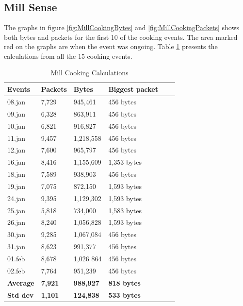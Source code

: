 \subsection{Mill Sense}
The graphs in figure \ref{fig:MillCookingBytes} and \ref{fig:MillCookingPackets} shows both bytes and packets for the first 10 of the cooking events. The area marked red on the graphs are when the event was ongoing. Table \ref{tab:MillCookingCalculations} presents the calculations from all the 15 cooking events. 

\begin{table}[!ht]
    \centering
    \caption{Mill Cooking Calculations}
    \begin{tabular}{|l|l|l|l|l|l|}
    \hline
        \textbf{Events} & \textbf{Packets} & \textbf{Bytes} & \textbf{Biggest packet} \\ \hline
        08.jan & 7,729 & 945,461 & 456 bytes \\ \hline
        09.jan & 6,328 & 863,911 & 456 bytes \\ \hline
        10.jan & 6,821 & 916,827 & 456 bytes \\ \hline
        11.jan & 9,457 & 1,218,558 & 456 bytes \\ \hline
        12.jan & 7,600 & 965,797 & 456 bytes \\ \hline
        16.jan & 8,416 & 1,155,609 & 1,353 bytes \\ \hline
        18.jan & 7,589 & 938,903 & 456 bytes \\ \hline
        19.jan & 7,075 & 872,150 & 1,593 bytes \\ \hline
        24.jan & 9,395 & 1,129,302 & 1,593 bytes \\ \hline
        25.jan & 5,818 & 734,000 & 1,583 bytes \\ \hline
        26.jan & 8,240 & 1,056,828 & 1,593 bytes \\ \hline
        30.jan & 9,285 & 1,067,084 & 456 bytes  \\ \hline
        31.jan & 8,623 & 991,377 & 456 bytes \\ \hline
        01.feb & 8,678 & 1,026 864 & 456 bytes \\ \hline
        02.feb & 7,764 & 951,239 & 456 bytes \\ \hline
        \textbf{Average} & \textbf{7,921} & \textbf{988,927} & \textbf{818 bytes} \\ \hline
        \textbf{Std dev} & \textbf{1,101} & \textbf{124,838} & \textbf{533 bytes} \\ \hline
    \end{tabular}
    \label{tab:MillCookingCalculations}
\end{table}

